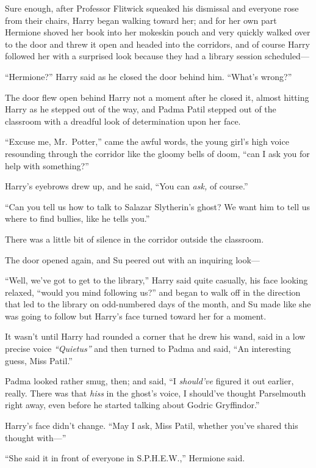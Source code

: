 Sure enough, after Professor Flitwick squeaked his dismissal and
everyone rose from their chairs, Harry began walking toward her; and for
her own part Hermione shoved her book into her mokeskin pouch and very
quickly walked over to the door and threw it open and headed into the
corridors, and of course Harry followed her with a surprised look
because they had a library session scheduled---

``Hermione?'' Harry said as he closed the door behind him. ``What's
wrong?''

The door flew open behind Harry not a moment after he closed it, almost
hitting Harry as he stepped out of the way, and Padma Patil stepped out
of the classroom with a dreadful look of determination upon her face.

``Excuse me, Mr.~Potter,'' came the awful words, the young girl's high
voice resounding through the corridor like the gloomy bells of doom,
``can I ask you for help with something?''

Harry's eyebrows drew up, and he said, ``You can \emph{ask,} of
course.''

``Can you tell us how to talk to Salazar Slytherin's ghost? We want him
to tell us where to find bullies, like he tells you.''

There was a little bit of silence in the corridor outside the classroom.

The door opened again, and Su peered out with an inquiring look---

``Well, we've got to get to the library,'' Harry said quite casually,
his face looking relaxed, ``would you mind following us?'' and began to
walk off in the direction that led to the library on odd-numbered days
of the month, and Su made like she was going to follow but Harry's face
turned toward her for a moment.

It wasn't until Harry had rounded a corner that he drew his wand, said
in a low precise voice \emph{``Quietus''} and then turned to Padma and
said, ``An interesting guess, Miss Patil.''

Padma looked rather smug, then; and said, ``I \emph{should've} figured
it out earlier, really. There was that \emph{hiss} in the ghost's voice,
I should've thought Parselmouth right away, even before he started
talking about Godric Gryffindor.''

Harry's face didn't change. ``May I ask, Miss Patil, whether you've
shared this thought with---''

``She said it in front of everyone in S.P.H.E.W.,'' Hermione said.

